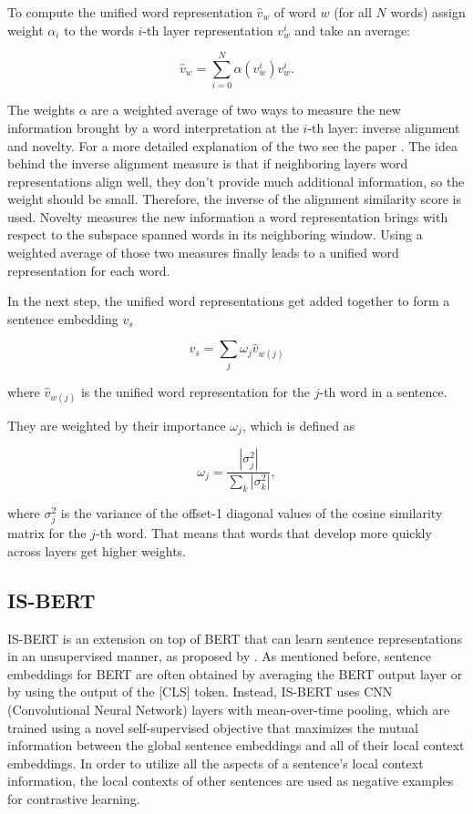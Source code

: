 To compute the unified word representation $\hat{v}_w$ of word $w$ (for all $N$ words) \citet{wang2020sbertwk} assign weight $\alpha_i$ to the words $i$-th layer representation $v^i_w$ and take an average:

\begin{equation}
    \hat{v}_w = \sum_{i=0}^{N} \alpha (v^i_w) v^i_w.
\end{equation}

The weights $\alpha$ are a weighted average of two ways to measure the new information brought by a word interpretation at the $i$-th layer: inverse alignment and novelty. For a more detailed explanation of the two see the paper \citep{wang2020sbertwk}. The idea behind the inverse alignment measure is that if neighboring layers word representations align well, they don't provide much additional information, so the weight should be small. Therefore, the inverse of the alignment similarity score is used. Novelty measures the new information a word representation brings with respect to the subspace spanned words in its neighboring window. Using a weighted average of those two measures finally leads to a unified word representation for each word.

In the next step, the unified word representations get added together to form a sentence embedding $v_s$

\begin{equation}
    v_s = \sum_{j} \omega_j \hat{v}_{w(j)}
\end{equation}

where $\hat{v}_{w(j)}$ is the unified word representation for the $j$-th word in a sentence.

They are weighted by their importance $\omega_j$, which is defined as

\begin{equation}
    \omega_j = \frac{|\sigma^2_j|}{\sum_{k} |\sigma^2_k|},
\end{equation}

where $\sigma^2_j$ is the variance of the offset-1 diagonal values of the cosine similarity matrix for the $j$-th word. That means that words that develop more quickly across layers get higher weights.

\subsection{IS-BERT}\label{is-bert}

IS-BERT is an extension on top of BERT that can learn sentence representations in an unsupervised manner, as proposed by \citet{zhang2020isbert}. As mentioned before, sentence embeddings for BERT are often obtained by averaging the BERT output layer or by using the output of the [CLS] token. Instead, IS-BERT uses CNN (Convolutional Neural Network) layers with mean-over-time pooling, which are trained using a novel self-supervised objective that maximizes the mutual information between the global sentence embeddings and all of their local context embeddings. In order to utilize all the aspects of a sentence's local context information, the local contexts of other sentences are used as negative examples for contrastive learning.

